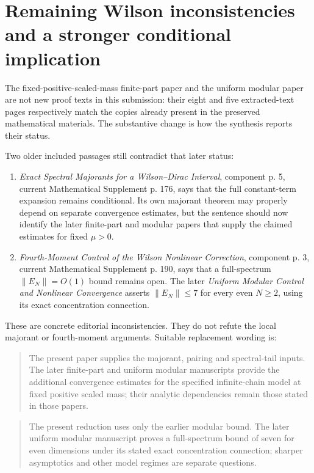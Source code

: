 \documentclass[11pt,a4paper]{article}
\begin{document}
\section{Remaining Wilson inconsistencies and a stronger conditional implication}

The fixed-positive-scaled-mass finite-part paper and the uniform modular paper are not new proof texts in this submission: their eight and five extracted-text pages respectively match the copies already present in the preserved mathematical materials. The substantive change is how the synthesis reports their status.

Two older included passages still contradict that later status:

\begin{enumerate}
\item \emph{Exact Spectral Majorants for a Wilson–Dirac Interval}, component p. 5, current Mathematical Supplement p. 176, says that the full constant-term expansion remains conditional. Its own majorant theorem may properly depend on separate convergence estimates, but the sentence should now identify the later finite-part and modular papers that supply the claimed estimates for fixed $\mu>0$.
\item \emph{Fourth-Moment Control of the Wilson Nonlinear Correction}, component p. 3, current Mathematical Supplement p. 190, says that a full-spectrum $\|E_N\|=O(1)$ bound remains open. The later \emph{Uniform Modular Control and Nonlinear Convergence} asserts $\|E_N\|\le7$ for every even $N\ge2$, using its exact concentration connection.
\end{enumerate}

These are concrete editorial inconsistencies. They do not refute the local majorant or fourth-moment arguments. Suitable replacement wording is:

\begin{quote}
The present paper supplies the majorant, pairing and spectral-tail inputs. The later finite-part and uniform modular manuscripts provide the additional convergence estimates for the specified infinite-chain model at fixed positive scaled mass; their analytic dependencies remain those stated in those papers.
\end{quote}

\begin{quote}
The present reduction uses only the earlier modular bound. The later uniform modular manuscript proves a full-spectrum bound of seven for even dimensions under its stated exact concentration connection; sharper asymptotics and other model regimes are separate questions.
\end{quote}
\end{document}
